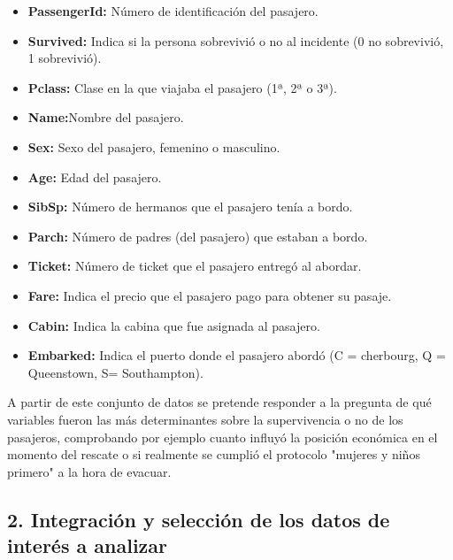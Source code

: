 \documentclass[12pt]{article}
\providecommand{\tightlist}{%
  \setlength{\itemsep}{0pt}\setlength{\parskip}{0pt}}
\begin{document}
\begin{itemize}
\tightlist
\item
  \textbf{PassengerId:} Número de identificación del pasajero.\\  
\item
  \textbf{Survived:} Indica si la persona sobrevivió o no al incidente (0 no sobrevivió, 1 sobrevivió).\\
\item
  \textbf{Pclass:} Clase en la que viajaba el pasajero (1ª, 2ª o 3ª).\\ 
\item
  \textbf{Name:}Nombre del pasajero.\\ 
\item
  \textbf{Sex:} Sexo del pasajero, femenino o masculino.\\
\item
  \textbf{Age:} Edad del pasajero.\\
\item
  \textbf{SibSp:} Número de hermanos que el pasajero tenía a bordo.\\
\item
  \textbf{Parch:} Número de padres (del pasajero) que estaban a bordo.\\
\item
  \textbf{Ticket:} Número de ticket que el pasajero entregó al abordar.\\
  \item
  \textbf{Fare:} Indica el precio que el pasajero pago para obtener su pasaje.\\
  \item
  \textbf{Cabin:} Indica la cabina que fue asignada al pasajero.\\
  \item
  \textbf{Embarked:} Indica el puerto donde el pasajero abordó (C = cherbourg, Q = Queenstown, S= Southampton).\\
\end{itemize}

A partir de este conjunto de datos se pretende responder a la pregunta de qué variables fueron las más determinantes sobre la supervivencia o no de los pasajeros, comprobando por ejemplo cuanto influyó la posición económica en el momento del rescate o si realmente se cumplió el protocolo "mujeres y niños primero" a la hora de evacuar.

	
\hypertarget{seleccion}{%
\subsection{2. Integración y selección de los datos de interés a analizar}\label{seleccion}}
\end{document}
